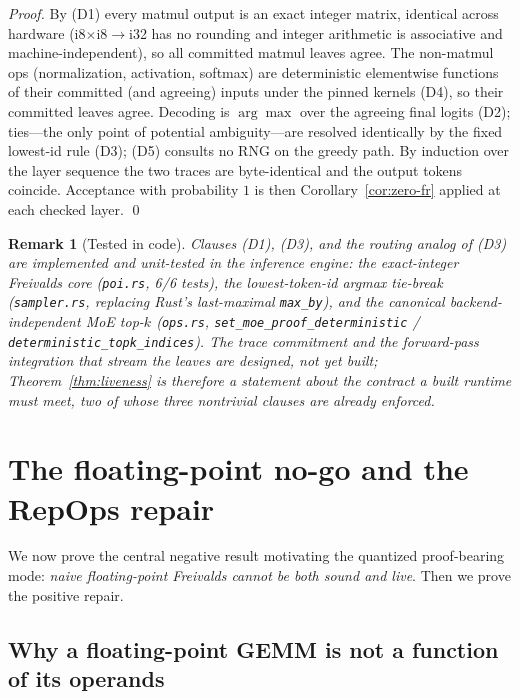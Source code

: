 \documentclass[11pt]{article}
\newtheorem{remark}{Remark}
\begin{document}
\begin{proof}
By (D1) every matmul output is an exact integer matrix, identical across hardware
(i8$\times$i8$\to$i32 has no rounding and integer arithmetic is associative and
machine-independent), so all committed matmul leaves agree. The non-matmul ops (normalization,
activation, softmax) are deterministic elementwise functions of their committed (and
agreeing) inputs under the pinned kernels (D4), so their committed leaves agree. Decoding is
$\arg\max$ over the agreeing final logits (D2); ties---the only point of potential
ambiguity---are resolved identically by the fixed lowest-id rule (D3); (D5) consults no RNG on
the greedy path. By induction over the layer sequence the two traces are byte-identical and
the output tokens coincide. Acceptance with probability $1$ is then
Corollary~\ref{cor:zero-fr} applied at each checked layer. \qed
\end{proof}

\begin{remark}[Tested in code]
Clauses (D1), (D3), and the routing analog of (D3) are implemented and unit-tested in the
inference engine: the exact-integer Freivalds core (\texttt{poi.rs}, 6/6 tests), the
lowest-token-id argmax tie-break (\texttt{sampler.rs}, replacing Rust's last-maximal
\texttt{max\_by}), and the canonical backend-independent MoE top-$k$ (\texttt{ops.rs},
\texttt{set\_moe\_proof\_deterministic} / \texttt{deterministic\_topk\_indices}). The trace
commitment and the forward-pass integration that stream the leaves are designed, not yet
built; Theorem~\ref{thm:liveness} is therefore a statement about the contract a built
runtime must meet, two of whose three nontrivial clauses are already enforced.
\end{remark}

\section{The floating-point no-go and the RepOps repair}
\label{sec:fp}

We now prove the central negative result motivating the quantized proof-bearing mode:
\emph{naive floating-point Freivalds cannot be both sound and live}. Then we prove the
positive repair.

\subsection{Why a floating-point GEMM is not a function of its operands}
\end{document}
